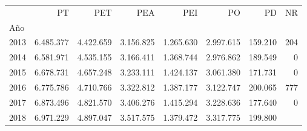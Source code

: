 \begin{tabular}{llllllll}
\cline{1-8}
\multicolumn{1}{c}{} &
  \multicolumn{1}{|r}{PT} &
  \multicolumn{1}{r}{PET} &
  \multicolumn{1}{r}{PEA} &
  \multicolumn{1}{r}{PEI} &
  \multicolumn{1}{r}{PO} &
  \multicolumn{1}{r}{PD} &
  \multicolumn{1}{r}{NR} \\
\cline{1-8}
\multicolumn{1}{l}{Año} &
  \multicolumn{1}{|r}{} &
  \multicolumn{1}{r}{} &
  \multicolumn{1}{r}{} &
  \multicolumn{1}{r}{} &
  \multicolumn{1}{r}{} &
  \multicolumn{1}{r}{} &
  \multicolumn{1}{r}{} \\
\multicolumn{1}{l}{\hspace{1em}2013} &
  \multicolumn{1}{|r}{6.485.377} &
  \multicolumn{1}{r}{4.422.659} &
  \multicolumn{1}{r}{3.156.825} &
  \multicolumn{1}{r}{1.265.630} &
  \multicolumn{1}{r}{2.997.615} &
  \multicolumn{1}{r}{159.210} &
  \multicolumn{1}{r}{204} \\
\multicolumn{1}{l}{\hspace{1em}2014} &
  \multicolumn{1}{|r}{6.581.971} &
  \multicolumn{1}{r}{4.535.155} &
  \multicolumn{1}{r}{3.166.411} &
  \multicolumn{1}{r}{1.368.744} &
  \multicolumn{1}{r}{2.976.862} &
  \multicolumn{1}{r}{189.549} &
  \multicolumn{1}{r}{0} \\
\multicolumn{1}{l}{\hspace{1em}2015} &
  \multicolumn{1}{|r}{6.678.731} &
  \multicolumn{1}{r}{4.657.248} &
  \multicolumn{1}{r}{3.233.111} &
  \multicolumn{1}{r}{1.424.137} &
  \multicolumn{1}{r}{3.061.380} &
  \multicolumn{1}{r}{171.731} &
  \multicolumn{1}{r}{0} \\
\multicolumn{1}{l}{\hspace{1em}2016} &
  \multicolumn{1}{|r}{6.775.786} &
  \multicolumn{1}{r}{4.710.766} &
  \multicolumn{1}{r}{3.322.812} &
  \multicolumn{1}{r}{1.387.177} &
  \multicolumn{1}{r}{3.122.747} &
  \multicolumn{1}{r}{200.065} &
  \multicolumn{1}{r}{777} \\
\multicolumn{1}{l}{\hspace{1em}2017} &
  \multicolumn{1}{|r}{6.873.496} &
  \multicolumn{1}{r}{4.821.570} &
  \multicolumn{1}{r}{3.406.276} &
  \multicolumn{1}{r}{1.415.294} &
  \multicolumn{1}{r}{3.228.636} &
  \multicolumn{1}{r}{177.640} &
  \multicolumn{1}{r}{0} \\
\multicolumn{1}{l}{\hspace{1em}2018} &
  \multicolumn{1}{|r}{6.971.229} &
  \multicolumn{1}{r}{4.897.047} &
  \multicolumn{1}{r}{3.517.575} &
  \multicolumn{1}{r}{1.379.472} &
  \multicolumn{1}{r}{3.317.775} &
  \multicolumn{1}{r}{199.800} &

\end{tabular}
